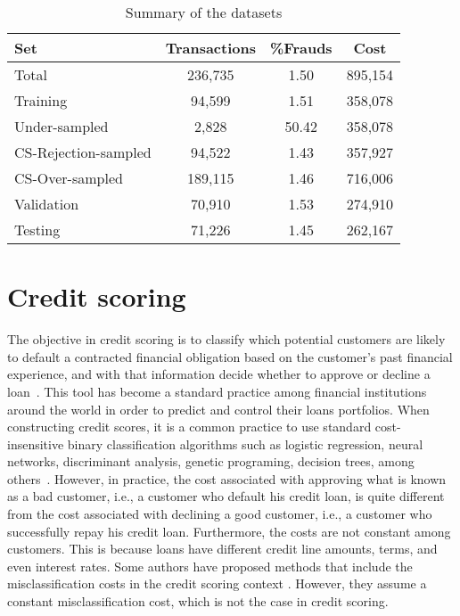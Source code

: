 	\begin{table}[t]
	\caption{Summary of the datasets}
	\label{tab:datasets}
	\centering
	\begin{tabular}{l c c c } %
		\\
		\hline
		\textbf{Set}&	\textbf{Transactions} &	\textbf{\%Frauds} & 
		\textbf{Cost} \\
		\hline
		Total&236,735&1.50&895,154\\
		Training&94,599&1.51&358,078\\
		Under-sampled&2,828&50.42&358,078\\
		CS-Rejection-sampled&94,522&1.43&357,927\\
		CS-Over-sampled&189,115&1.46&716,006\\
		Validation&70,910&1.53&274,910\\
		Testing&71,226&1.45&262,167\\
		\hline
	\end{tabular}
\end{table}


\section{Credit scoring}

  The objective in credit scoring is to classify which potential customers are likely to default a 
  contracted financial obligation based on the customer's past financial experience, and with that 
  information decide whether to approve or decline a loan~\citep{Anderson2007}. This tool has 
become 
  a standard practice among financial institutions around the world in order to predict and 
  control their loans portfolios. When constructing credit scores, it is a common practice to use 
  standard cost-insensitive binary classification algorithms such as logistic regression, neural 
  networks, discriminant analysis, genetic programing, decision trees, among 
  others~\citep{Hand1997,Bahnsen2011}. However, in practice, the cost associated with approving 
  what is known as a bad customer, i.e., a customer who default his credit loan, is quite 
  different from the cost associated with declining a good customer,  i.e., a customer who 
  successfully repay his credit loan. Furthermore, the costs are not constant among customers. 
  This is because loans have different credit line amounts, terms, and even interest rates. Some 
  authors have proposed methods that include the misclassification costs in the credit scoring 
  context \citep{Verbraken2014,Alejo2013,Beling2005,Oliver2009}. However, they assume a constant 
  misclassification cost, which is not the case in credit scoring.
  
